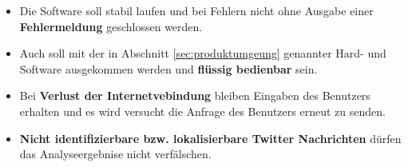 \begin{itemize}
	\item Die Software soll stabil laufen und bei Fehlern nicht ohne Ausgabe einer \textbf{Fehlermeldung} geschlossen werden.
	\item Auch soll mit der in Abschnitt \ref{sec:produktumgeung} genannter Hard- und Software ausgekommen werden und \textbf{flüssig bedienbar} sein.
	\item Bei \textbf{Verlust der Internetvebindung} bleiben Eingaben des Benutzers erhalten und es wird versucht die Anfrage des Benutzers erneut zu senden.
	\item \textbf{Nicht identifizierbare bzw. lokalisierbare Twitter Nachrichten} dürfen das Analyseergebnise nicht verfälschen.
\end{itemize}
